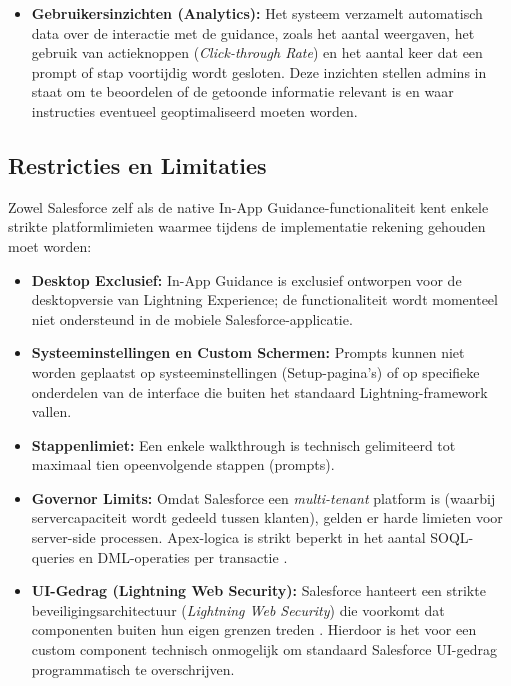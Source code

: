 \begin{itemize}
	\item \textbf{Gebruikersinzichten (Analytics):} Het systeem verzamelt automatisch data over de interactie met de guidance, zoals het aantal weergaven, het gebruik van actieknoppen (\textit{Click-through Rate}) en het aantal keer dat een prompt of stap voortijdig wordt gesloten. Deze inzichten stellen admins in staat om te beoordelen of de getoonde informatie relevant is en waar instructies eventueel geoptimaliseerd moeten worden.
	
\end{itemize}

\subsection{Restricties en Limitaties}
Zowel Salesforce zelf als de native In-App Guidance-functionaliteit kent enkele strikte platformlimieten waarmee tijdens de implementatie rekening gehouden moet worden:

\begin{itemize}
	\item \textbf{Desktop Exclusief:} In-App Guidance is exclusief ontworpen voor de desktopversie van Lightning Experience; de functionaliteit wordt momenteel niet ondersteund in de mobiele Salesforce-applicatie.
	\item \textbf{Systeeminstellingen en Custom Schermen:} Prompts kunnen niet worden geplaatst op systeeminstellingen (Setup-pagina's) of op specifieke onderdelen van de interface die buiten het standaard Lightning-framework vallen.
	\item \textbf{Stappenlimiet:} Een enkele walkthrough is technisch gelimiteerd tot maximaal tien opeenvolgende stappen (prompts).
	\item \textbf{Governor Limits:} Omdat Salesforce een \textit{multi-tenant} platform is (waarbij servercapaciteit wordt gedeeld tussen klanten), gelden er harde limieten voor server-side processen. Apex-logica is strikt beperkt in het aantal SOQL-queries en DML-operaties per transactie \autocite{SalesforceGovLimits}.
	\item \textbf{UI-Gedrag (Lightning Web Security):} Salesforce hanteert een strikte beveiligingsarchitectuur (\textit{Lightning Web Security}) die voorkomt dat componenten buiten hun eigen grenzen treden \autocite{SalesforceLWS}. Hierdoor is het voor een custom component technisch onmogelijk om standaard Salesforce UI-gedrag programmatisch te overschrijven.
\end{itemize}



